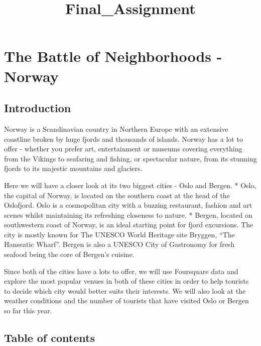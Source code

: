 \documentclass[11pt]{article}
\title{Final\_Assignment }
\begin{document}
    
    \maketitle
    
    

    
    \hypertarget{the-battle-of-neighborhoods---norway}{%
\section{The Battle of Neighborhoods -
Norway}\label{the-battle-of-neighborhoods---norway}}

\hypertarget{introduction}{%
\subsection{Introduction}\label{introduction}}

    Norway is a Scandinavian country in Northern Europe with an extensive
coastline broken by huge fjords and thousands of islands. Norway has a
lot to offer - whether you prefer art, entertainment or museums covering
everything from the Vikings to seafaring and fishing, or spectacular
nature, from its stunning fjords to its majestic mountains and glaciers.

Here we will have a closer look at its two biggest cities - Oslo and
Bergen. * Oslo, the capital of Norway, is located on the southern coast
at the head of the Oslofjord. Oslo is a cosmopolitan city with a buzzing
restaurant, fashion and art scenes whilst maintaining its refreshing
closeness to nature. * Bergen, located on southwestern coast of Norway,
is an ideal starting point for fjord excursions. The city is mostly
known for The UNESCO World Heritage site Bryggen, ``The Hanseatic
Wharf''. Bergen is also a UNESCO City of Gastronomy for fresh seafood
being the core of Bergen's cuisine.

Since both of the cities have a lots to offer, we will use Foursquare
data and explore the most popular venues in both of these cities in
order to help tourists to decide which city would better suits their
interests. We will also look at the weather conditions and the number of
tourists that have visited Oslo or Bergen so far this year.

    \hypertarget{table-of-contents}{%
\subsection{Table of contents}\label{table-of-contents}}
\end{document}
